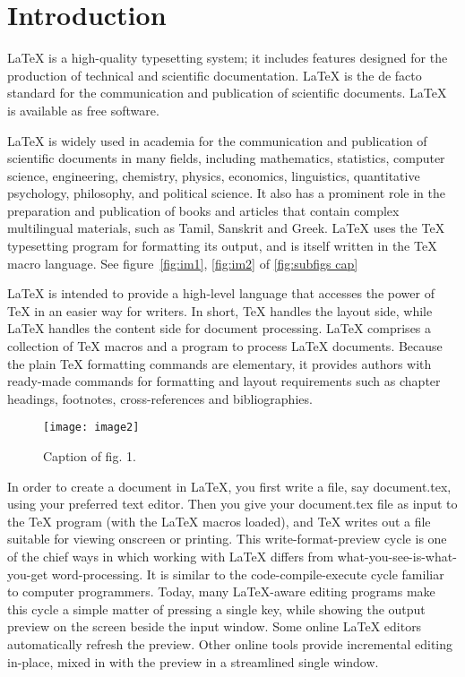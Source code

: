 \chapter{Introduction}\label{ch:ch1}
LaTeX is a high-quality typesetting system; it includes features designed for the production of technical and scientific documentation. LaTeX is the de facto standard for the communication and publication of scientific documents. LaTeX is available as free software.

LaTeX is widely used in academia for the communication and publication of scientific documents in many fields, including mathematics, statistics, computer science, engineering, chemistry, physics, economics, linguistics, quantitative psychology, philosophy, and political science. It also has a prominent role in the preparation and publication of books and articles that contain complex multilingual materials, such as Tamil, Sanskrit and Greek. LaTeX uses the TeX typesetting program for formatting its output, and is itself written in the TeX macro language. See figure~\ref{fig:im1}, \ref{fig:im2} of \ref{fig:subfigs cap}

LaTeX is intended to provide a high-level language that accesses the power of TeX in an easier way for writers. In short, TeX handles the layout side, while LaTeX handles the content side for document processing. LaTeX comprises a collection of TeX macros and a program to process LaTeX documents. Because the plain TeX formatting commands are elementary, it provides authors with ready-made commands for formatting and layout requirements such as chapter headings, footnotes, cross-references and bibliographies.
\begin{figure}
	\centering
	\texttt{[image: image2]}
	\caption{Caption of fig. 1.}
	\label{fig:image2}
\end{figure}

In order to create a document in LaTeX, you first write a file, say document.tex, using your preferred text editor. Then you give your document.tex file as input to the TeX program (with the LaTeX macros loaded), and TeX writes out a file suitable for viewing onscreen or printing. This write-format-preview cycle is one of the chief ways in which working with LaTeX differs from what-you-see-is-what-you-get word-processing. It is similar to the code-compile-execute cycle familiar to computer programmers. Today, many LaTeX-aware editing programs make this cycle a simple matter of pressing a single key, while showing the output preview on the screen beside the input window. Some online LaTeX editors automatically refresh the preview. Other online tools provide incremental editing in-place, mixed in with the preview in a streamlined single window.

